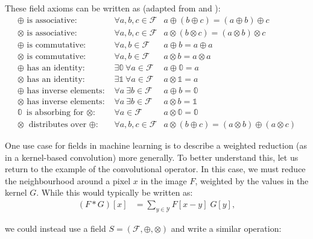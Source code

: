 \documentclass[a4paper, 12pt]{report}
\begin{document}
These field axioms can be written as (adapted from \cite{beachy2006abstract} and \cite{bellaardaxiomatic}):
\begin{align}
\textrm{$\oplus$ is associative: }&\forall a,b,c\in \mathcal{F} &  a \oplus (b \oplus c) = (a\oplus b) \oplus c \\ 
\textrm{$\otimes$ is associative: }&\forall a,b,c\in \mathcal{F} &  a \otimes (b \otimes c) = (a\otimes b) \otimes c \\ 
\textrm{$\oplus$ is commutative: }&\forall a,b\in \mathcal{F} & a\oplus b = a  \oplus a \\
\textrm{$\otimes$ is commutative: }&\forall a,b\in \mathcal{F} & a\otimes b = a  \otimes a \\
\oplus\textrm{ has an identity: }& \exists \mathbb{0} ~\forall a\in \mathcal{F} & a\oplus \mathbb{0} = a \\ 
\otimes\textrm{ has an identity: }& \exists \mathbb{1} ~\forall a\in \mathcal{F} & a\otimes \mathbb{1} = a \\ 
\oplus\textrm{ has inverse elements: }& \forall a~\exists b\in \mathcal{F} & a\oplus b = \mathbb{0} \label{eq:additive-inverse}  \\ 
\otimes\textrm{ has inverse elements: }& \forall a~\exists b\in \mathcal{F} & a\otimes b = \mathbb{1}  \\ 
\mathbb{0} \textrm{ is absorbing for $\otimes$: }&\forall a\in \mathcal{F} & a\otimes \mathbb{0} = \mathbb{0}\\
\otimes \textrm{ distributes over $\oplus$: }&\forall a,b,c\in \mathcal{F} & a\otimes (b \oplus c) = (a\otimes b)\oplus(a\otimes c)
\end{align}

One use case for fields in machine learning is to describe a weighted reduction (as in a kernel-based convolution) more generally. To better understand this, let us return to the example of the convolutional operator. In this case, we must reduce the neighbourhood around a pixel $x$ in the image $F$, weighted by the values in the kernel $G$. While this would typically be written as:
\begin{align}
	(F*G)[x] &= \sum_{y\in\mathcal{Y}} F[x-y]\; G[y],
\end{align}

\noindent
we could instead use a field $S=(\mathcal{F}, \oplus, \otimes)$ and write a similar operation:
\end{document}

